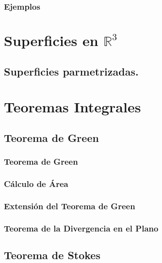 \documentclass{report}
\begin{document}
          \subsection{Ejemplos}
         
         
          
          
            
   
  

  \chapter{Superficies en $\mathbb{R}^{3}$ } 
      \section{Superficies parmetrizadas.}
         
  


   

  \chapter{Teoremas Integrales }       
       \section{Teorema de Green}
       \subsection{Teorema de Green}
            
        \subsection{Cálculo de Área}
            
        \subsection{Extensión del Teorema de Green}
            
        \subsection{Teorema de la Divergencia en el Plano}
            
     \section{Teorema de Stokes}
\end{document}
